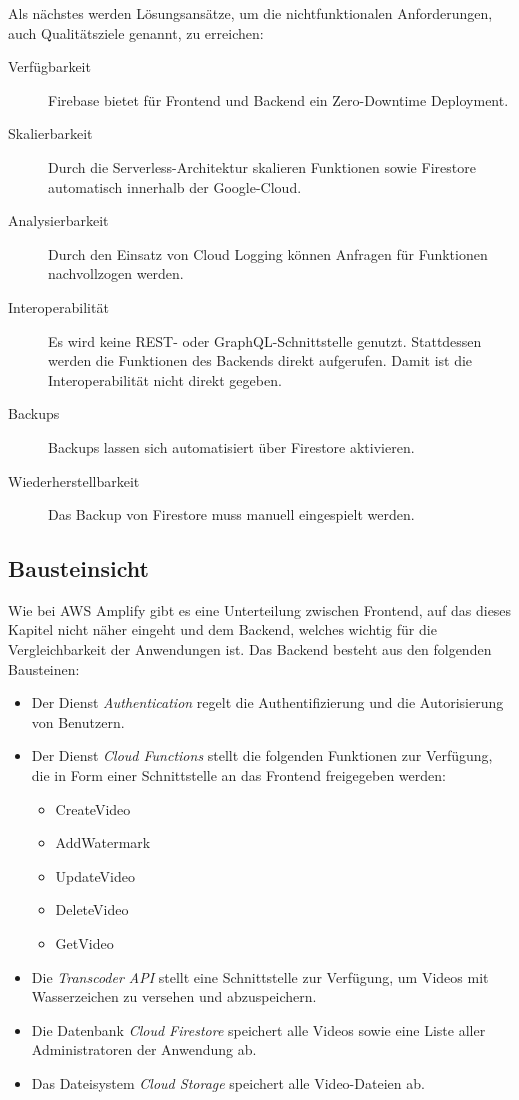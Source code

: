 Als nächstes werden Lösungsansätze, um die nichtfunktionalen Anforderungen, auch Qualitätsziele genannt, zu erreichen:

\begin{description}
   \item[Verfügbarkeit] Firebase bietet für Frontend und Backend ein Zero-Downtime Deployment.
   \item[Skalierbarkeit] Durch die Serverless-Architektur skalieren Funktionen sowie Firestore automatisch innerhalb der Google-Cloud.
   \item[Analysierbarkeit] Durch den Einsatz von Cloud Logging können Anfragen für Funktionen nachvollzogen werden.
   \item[Interoperabilität] Es wird keine REST- oder GraphQL-Schnittstelle genutzt. Stattdessen werden die Funktionen des Backends direkt aufgerufen. Damit ist die Interoperabilität nicht direkt gegeben.
   \item[Backups] Backups lassen sich automatisiert über Firestore aktivieren.
   \item[Wiederherstellbarkeit] Das Backup von Firestore muss manuell eingespielt werden.
\end{description}

\subsection{Bausteinsicht}

Wie bei \ac{AWS} Amplify gibt es eine Unterteilung zwischen Frontend, auf das dieses Kapitel nicht näher eingeht und dem Backend, welches wichtig für die Vergleichbarkeit der Anwendungen ist. Das Backend besteht aus den folgenden Bausteinen:

\begin{itemize}
  \item{Der Dienst \textit{Authentication} regelt die Authentifizierung und die Autorisierung von Benutzern.}
  \item{Der Dienst \textit{Cloud Functions} stellt die folgenden Funktionen zur Verfügung, die in Form einer Schnittstelle an das Frontend freigegeben werden:}
  \begin{itemize}
    \item CreateVideo
    \item AddWatermark
    \item UpdateVideo
    \item DeleteVideo
    \item GetVideo
  \end{itemize}
  \item{Die \textit{Transcoder API} stellt eine Schnittstelle zur Verfügung, um Videos mit Wasserzeichen zu versehen und abzuspeichern.}
  \item{Die Datenbank \textit{Cloud Firestore} speichert alle Videos sowie eine Liste aller Administratoren der Anwendung ab.}
  \item{Das Dateisystem \textit{Cloud Storage} speichert alle Video-Dateien ab.}
\end{itemize}

